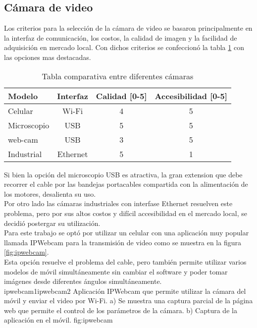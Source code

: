 \subsection{Cámara de video}
   Los criterios para la selección de la cámara de video se basaron principalmente en la interfaz de comunicación, los costos, la calidad de imagen y la facilidad de adquisición en mercado local. 
   Con dichos criterios se confeccionó la tabla \ref{tab:camara_selection} con las opciones mas destacadas.

   \begin{table}[h]
   \centering
   \caption[Seleccion de la cámara]{Tabla comparativa entre diferentes cámaras}
   \begin{tabular}{l c c c}
      \toprule
      \textbf{Modelo}    & \textbf{Interfaz}       & \textbf{Calidad [0-5]} & \textbf{Accesibilidad [0-5]}  \\
      \midrule
      Celular     & Wi-Fi    & 4& 5\\
      Microscopio & USB      & 5& 5\\
      web-cam     & USB      & 3& 5\\
      Industrial  & Ethernet & 5& 1\\
      \bottomrule
      \hline
   \end{tabular}
   \label{tab:camara_selection}
\end{table}

Si bien la opción del microscopio USB es atractiva, la gran extension que debe recorrer el cable por las bandejas portacables compartida con la alimentación de los motores, desalienta su uso. \\
   Por otro lado las cámaras industriales con interfase Ethernet resuelven este problema, pero por sus altos costos y difícil accesibilidad en el mercado local, se decidió postergar su utilización.\\
   Para este trabajo se optó por utilizar un celular con una aplicación muy popular llamada IPWebcam \citep{WEBSITE:ipwebcam} para la transmisión de video como se muestra en la figura \ref{fig:ipwebcam}. \\
   Esta opción resuelve el problema del cable, pero también permite utilizar varios modelos de móvil simultáneamente sin cambiar el software y poder tomar imágenes desde diferentes ángulos simultáneamente. \\

            {ipwebcam1}{ipwebcam2}
            {Aplicación IPWebcam que permite utilizar la cámara del móvil y enviar el video por Wi-Fi. a) Se muestra una captura parcial de la página web que permite el control de los parámetros de la cámara. b) Captura de la aplicación en el móvil.}
            {fig:ipwebcam}

